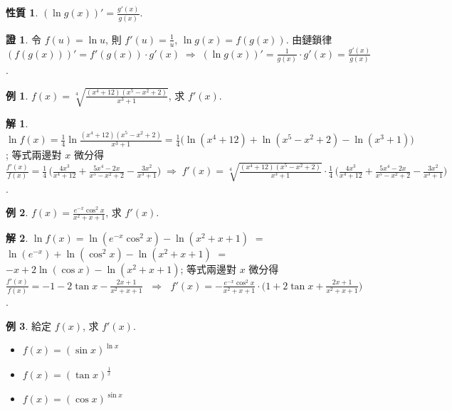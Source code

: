 \documentclass[12pt]{extarticle}
\newcommand{\ds}{\displaystyle}
\newcommand{\ie}{\;\Longrightarrow\;}
\theoremstyle{definition}
\newtheorem*{prp}{性質}
\newtheorem*{ex}{例}
\newtheorem*{sol}{解}
\newtheorem*{prf}{證}
\begin{document}
\begin{prp}
  $\ds(\ln g(x))' = \frac{g'(x)}{g(x)}$.  
\end{prp}

\begin{prf}
  令 $\ds f(u) = \ln u$, 則 $\ds f'(u) = \frac{1}{u}$, $\ds\ln g(x) = f(g(x))$. 由鏈鎖律 $\ds(f(g(x)))' = f'(g(x))\cdot g'(x) \ie (\ln g(x))' = \frac{1}{g(x)}\cdot g'(x) = \frac{g'(x)}{g(x)}$. 
\end{prf}

\begin{ex}
  $\ds f(x) = \sqrt[4]{\frac{(x^4 + 12)(x^5 - x^2 + 2)}{x^3 + 1}}$, 求 $f'(x)$. 
\end{ex}

\begin{sol}
  $\ds\ln f(x) = \frac{1}{4}\ln\frac{(x^4 + 12)(x^5 - x^2 + 2)}{x^3 + 1} = \frac{1}{4}\big(\ln(x^4 + 12) + \ln(x^5 - x^2 + 2) - \ln(x^3 + 1)\big)$; 等式兩邊對 $x$ 微分得 $\ds\frac{f'(x)}{f(x)} = \frac{1}{4}\,\Big(\frac{4x^3}{x^4 + 12} + \frac{5x^4 - 2x}{x^5 - x^2 + 2} - \frac{3x^2}{x^3 + 1}\Big) \ie f'(x) = \sqrt[4]{\frac{(x^4 + 12)(x^5 - x^2 + 2)}{x^3 + 1}}\cdot\frac{1}{4}\,\Big(\frac{4x^3}{x^4 + 12} + \frac{5x^4 - 2x}{x^5 - x^2 + 2} - \frac{3x^2}{x^3 + 1}\Big)$. 
\end{sol}

\begin{ex}
  $\ds f(x) = \frac{e^{-x}\cos^2 x}{x^2 + x + 1}$, 求 $f'(x)$. 
\end{ex}

\begin{sol}
  $\ds\ln f(x) = \ln(e^{-x}\cos^2 x) - \ln(x^2 + x + 1)$ $=$ $\ds\ln(e^{-x}) + \ln(\cos^2 x) - \ln(x^2 + x + 1)$ $=$ $\ds -x + 2\ln(\cos x) - \ln(x^2 + x + 1)$; 等式兩邊對 $x$ 微分得 $\ds\frac{f'(x)}{f(x)} = -1 - 2\tan x - \frac{2x + 1}{x^2 + x + 1}$ $\ie$ $\ds f'(x) = -\frac{e^{-x}\cos^2 x}{x^2 + x + 1}\cdot\Big(1 + 2\tan x + \frac{2x + 1}{x^2 + x + 1}\Big)$. 
\end{sol}

\begin{ex} 給定 $f(x)$, 求 $f'(x)$.
  \setlength{\columnsep}{5mm}
  \begin{multicols}{3}
    \begin{itemize}\setlength\itemsep{0em}
      \item $\ds f(x) = (\sin x)^{\ln x}$
      \item $\ds f(x) = (\tan x)^{\frac{1}{x}}$
      \item $\ds f(x) = (\cos x)^{\sin x}$
    \end{itemize}
  \end{multicols}
\end{ex}
\end{document}
